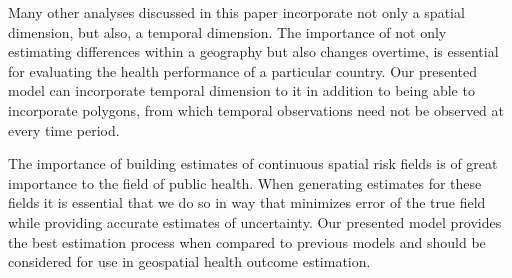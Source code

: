 \documentclass{article}
\begin{document}
Many other analyses discussed in this paper incorporate not only a spatial dimension, but also, a temporal dimension. The importance of not only estimating differences within a geography but also changes overtime, is essential for evaluating the health performance of a particular country. Our presented model can incorporate temporal dimension to it in addition to being able to incorporate polygons, from which temporal observations need not be observed at every time period.

The importance of building estimates of continuous spatial risk fields is of great importance to the field of public health. When generating estimates for these fields it is essential that we do so in way that minimizes error of the true field while providing accurate estimates of uncertainty. Our presented model provides the best estimation process when compared to previous models and should be considered for use in geospatial health outcome estimation.

\newpage



\end{document}
